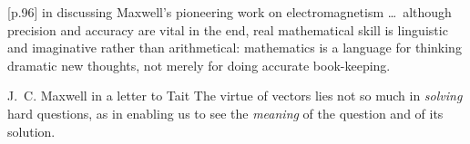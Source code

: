 \begin{quoted}{\cite{Arianrhod2003} [p.96] in discussing
Maxwell's pioneering work on electromagnetism}
\ldots\ although precision and accuracy are vital in the
end, real mathematical skill is linguistic and imaginative
rather than arithmetical: mathematics is a language for
thinking dramatic new thoughts, not merely for doing
accurate book-keeping.
\end{quoted}

\begin{quoted}{J.~C. Maxwell in a letter to Tait 
\cite[p.224]{Arianrhod2003}}
The virtue of vectors lies not so much in \emph{solving} 
hard questions, as in enabling us to see the \emph{meaning} 
of the question and of its solution.
\end{quoted}

